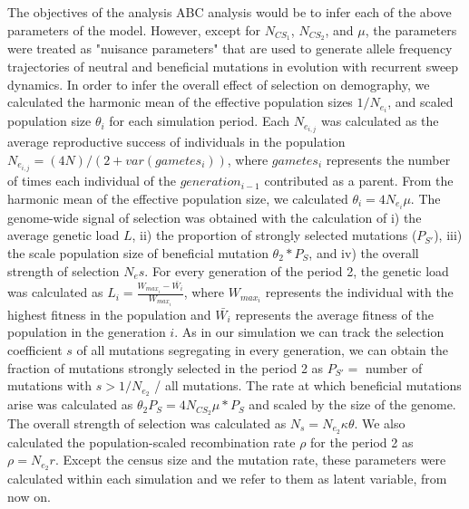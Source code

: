 \documentclass[12pt]{article}
\begin{document}
The objectives of the analysis ABC analysis would be to infer each of the above parameters of the model. However, except for $N_{CS_{1}}$, $N_{CS_{2}}$, and $\mu$, the parameters were treated as "nuisance parameters" that are used to generate allele frequency trajectories of neutral and beneficial mutations in evolution with recurrent sweep dynamics. In order to infer the overall effect of selection on demography, we calculated the harmonic mean of the effective population sizes $1/N_{e_{i}}$, and scaled population size  $\theta_{i}$ for each simulation period. Each $N_{e_{i,j}}$ was calculated as the average reproductive success of individuals in the population $N_{e_{i,j}} = (4N)/(2+var(gametes_{i}))$, where $gametes_{i}$ represents the number of times each individual of the $generation_{i-1}$ contributed as a parent. From the harmonic mean of the effective population size, we calculated $\theta_{i} = 4N_{e_{i}}\mu$. 
The genome-wide signal of selection was obtained with the calculation of  i) the average genetic load $L$,  ii) the proportion of strongly selected mutations ($P_{S'}$),  iii) the scale population size of beneficial mutation $\theta_{2}*P_{S}$, and iv) the overall strength of selection $N_{e}s$. For every generation of the period 2, the genetic load was calculated as $L_{i} = \frac{W_{max_{i}} - \bar{W_{i}}}{W_{max_{i}}}$, where $W_{max_{i}}$ represents the individual with the highest fitness in the population and $\bar{W_{i}}$ represents the average fitness of the population in the generation $i$. As in our simulation we can track the selection coefficient $s$ of all mutations segregating in every generation, we can obtain the fraction of mutations strongly selected in the period 2 as $P_{S'} = $ number of mutations with $s > 1/N_{e_{2}}$ / all mutations. The rate at which beneficial mutations arise was calculated as $\theta_{2}P_{S} = 4N_{CS_{2}}\mu * P_{S}$ and scaled by the size of the genome. The overall strength of selection was calculated as $N_{s} = N_{e_{2}}\kappa\theta$. We also calculated the population-scaled recombination rate $\rho$ for the period 2 as $\rho = N_{e_{2}}r$. Except the census size and the mutation rate, these parameters were calculated within each simulation and we refer to them as latent variable, from now on. 
\end{document}
